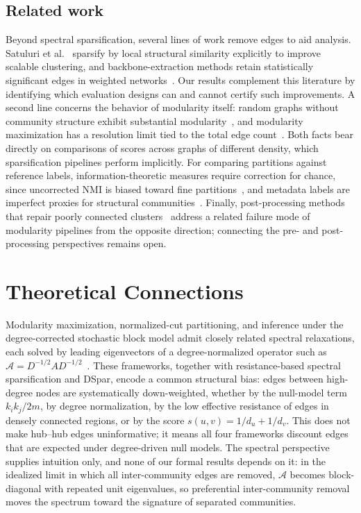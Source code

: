 \documentclass[10pt,journal,compsoc]{IEEEtran}
\begin{document}
\subsection*{Related work}
Beyond spectral sparsification, several lines of work remove edges to aid analysis.
Satuluri et al.~\cite{satuluri2011local} sparsify by local structural similarity explicitly to improve scalable clustering, and backbone-extraction methods retain statistically significant edges in weighted networks~\cite{serrano2009extracting, coscia2017backboning}.
Our results complement this literature by identifying which evaluation designs can and cannot certify such improvements.
A second line concerns the behavior of modularity itself: random graphs without community structure exhibit substantial modularity~\cite{guimera2004modularity}, and modularity maximization has a resolution limit tied to the total edge count~\cite{fortunato2007resolution}. Both facts bear directly on comparisons of scores across graphs of different density, which sparsification pipelines perform implicitly.
For comparing partitions against reference labels, information-theoretic measures require correction for chance, since uncorrected NMI is biased toward fine partitions~\cite{vinh2010information}, and metadata labels are imperfect proxies for structural communities~\cite{hric2014community, peel2017ground}.
Finally, post-processing methods that repair poorly connected clusters~\cite{park_cm_2024-journal, ramavarapu2024cm++, dindoost2025optimization} address a related failure mode of modularity pipelines from the opposite direction; connecting the pre- and post-processing perspectives remains open.

\section{Theoretical Connections}
\label{sec:theory}

Modularity maximization, normalized-cut partitioning, and inference under the degree-corrected stochastic block model admit closely related spectral relaxations, each solved by leading eigenvectors of a degree-normalized operator such as $\mathcal{A} = D^{-1/2} A D^{-1/2}$~\cite{newman2013spectral, karrer2011stochastic, shi2000normalized}.
These frameworks, together with resistance-based spectral sparsification and DSpar, encode a common structural bias: edges between high-degree nodes are systematically down-weighted, whether by the null-model term $k_i k_j / 2m$, by degree normalization, by the low effective resistance of edges in densely connected regions, or by the score $s(u,v) = 1/d_u + 1/d_v$.
This does not make hub--hub edges uninformative; it means all four frameworks discount edges that are expected under degree-driven null models.
The spectral perspective supplies intuition only, and none of our formal results depends on it: in the idealized limit in which all inter-community edges are removed, $\mathcal{A}$ becomes block-diagonal with repeated unit eigenvalues, so preferential inter-community removal moves the spectrum toward the signature of separated communities.
\end{document}
